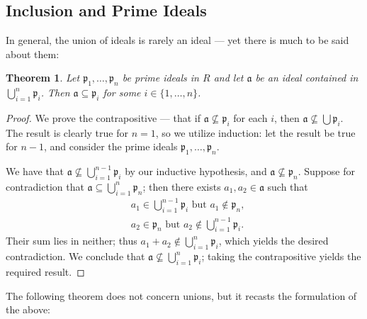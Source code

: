 \documentclass[11pt]{article}
\newtheorem{theorem}{Theorem}
\begin{document}

\subsection{Inclusion and Prime Ideals}

In general, the union of ideals is rarely an ideal --- yet there is much to be said about them:

\begin{adjustwidth}{0.5cm}{}
	\begin{theorem}
		Let $\mathfrak{p}_{1}, \ldots, \mathfrak{p}_{n}$ be prime ideals in $R$ and let $\mathfrak{a}$ be an ideal contained in $\bigcup_{i = 1}^{n} \mathfrak{p}_{i}$. Then $\mathfrak{a} \subseteq \mathfrak{p}_{i}$ for some $i \in \{ 1, \ldots, n \}$.
	\end{theorem}
	\begin{proof}
		We prove the contrapositive --- that if $\mathfrak{a} \nsubseteq \mathfrak{p}_{i}$ for each $i$, then $\mathfrak{a} \nsubseteq \bigcup \mathfrak{p}_{i}$. The result is clearly true for $n = 1$, so we utilize induction: let the result be true for $n - 1$, and consider the prime ideals $\mathfrak{p}_{1}, \ldots, \mathfrak{p}_{n}$.

		We have that $\mathfrak{a} \nsubseteq \bigcup_{i = 1}^{n - 1} \mathfrak{p}_{i}$ by our inductive hypothesis, and $\mathfrak{a} \nsubseteq \mathfrak{p}_{n}$. Suppose for contradiction that $\mathfrak{a} \subseteq \bigcup_{i = 1}^{n} \mathfrak{p}_{n}$; then there exists $a_{1}, a_{2} \in \mathfrak{a}$ such that
		\begin{align*}
			&\text{$a_{1} \in \bigcup_{i = 1}^{n - 1} \mathfrak{p}_{i}$ but $a_{1} \notin \mathfrak{p}_{n}$}, \\
			&\text{$a_{2} \in \mathfrak{p}_{n}$ but $a_{2} \notin \bigcup_{i = 1}^{n - 1} \mathfrak{p}_{i}$}.
		\end{align*}
		Their sum lies in neither; thus $a_{1} + a_{2} \notin \bigcup_{i = 1}^{n} \mathfrak{p}_{i}$, which yields the desired contradiction. We conclude that $\mathfrak{a} \nsubseteq \bigcup_{i = 1}^{n} \mathfrak{p}_{i}$; taking the contrapositive yields the required result.
	\end{proof}
\end{adjustwidth}

The following theorem does not concern unions, but it recasts the formulation of the above: 
\end{document}
